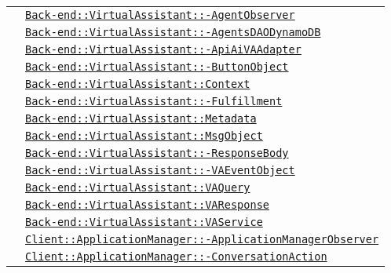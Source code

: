 \begin{longtable}{|>{\centering}m{3cm}|m{10cm}<{\centering}|}
& \hyperref[Back-end::VirtualAssistant::AgentObserver]{\texttt{Back-end::VirtualAssistant::-\linebreak AgentObserver}}\\
& \hyperref[Back-end::VirtualAssistant::AgentsDAODynamoDB]{\texttt{Back-end::VirtualAssistant::-\linebreak AgentsDAODynamoDB}}\\
& \hyperref[Back-end::VirtualAssistant::ApiAiVAAdapter]{\texttt{Back-end::VirtualAssistant::-\linebreak ApiAiVAAdapter}}\\
& \hyperref[Back-end::VirtualAssistant::ButtonObject]{\texttt{Back-end::VirtualAssistant::-\linebreak ButtonObject}}\\
& \hyperref[Back-end::VirtualAssistant::Context]{\texttt{Back-end::VirtualAssistant::Context}}\\
& \hyperref[Back-end::VirtualAssistant::Fulfillment]{\texttt{Back-end::VirtualAssistant::-\linebreak Fulfillment}}\\
& \hyperref[Back-end::VirtualAssistant::Metadata]{\texttt{Back-end::VirtualAssistant::Metadata}}\\
& \hyperref[Back-end::VirtualAssistant::MsgObject]{\texttt{Back-end::VirtualAssistant::MsgObject}}\\
& \hyperref[Back-end::VirtualAssistant::ResponseBody]{\texttt{Back-end::VirtualAssistant::-\linebreak ResponseBody}}\\
& \hyperref[Back-end::VirtualAssistant::VAEventObject]{\texttt{Back-end::VirtualAssistant::-\linebreak VAEventObject}}\\
& \hyperref[Back-end::VirtualAssistant::VAQuery]{\texttt{Back-end::VirtualAssistant::VAQuery}}\\
& \hyperref[Back-end::VirtualAssistant::VAResponse]{\texttt{Back-end::VirtualAssistant::VAResponse}}\\
& \hyperref[Back-end::VirtualAssistant::VAService]{\texttt{Back-end::VirtualAssistant::VAService}}\\
& \hyperref[Client::ApplicationManager::ApplicationManagerObserver]{\texttt{Client::ApplicationManager::-\linebreak ApplicationManagerObserver}}\\
& \hyperref[Client::ApplicationManager::ConversationAction]{\texttt{Client::ApplicationManager::-\linebreak ConversationAction}}\\

\end{longtable}
